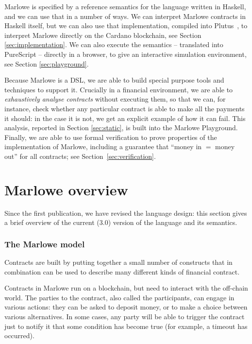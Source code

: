 \documentclass[runningheads]{llncs}
\begin{document}
Marlowe is specified by a reference semantics for the language written in Haskell, and we can use that in a number of ways. We can interpret Marlowe contracts in Haskell itself, but we can also use that implementation, compiled into Plutus~\cite{PlutusPlatform}, to interpret Marlowe directly on the Cardano blockchain, see Section \ref{sec:implementation}. We can also execute the semantics -- translated into PureScript -- directly in a browser, to give an interactive simulation environment, see Section \ref{sec:playground}.

Because Marlowe is a DSL, we are able to build special purpose tools and techniques to support it. Crucially in a financial environment, we are able to \emph{exhaustively analyse contracts} without executing them, so that we can, for instance, check whether any particular contract is able to make all the payments it should: in the case it is not, we get an explicit example of how it can fail. This analysis, reported in Section \ref{sec:static}, is built into the Marlowe Playground. Finally, we are able to use formal verification to prove properties of the implementation of Marlowe, including a guarantee that ``money in $=$ money out'' for all contracts; see Section~\ref{sec:verification}.

\section{Marlowe overview}
\label{sec:overview}

Since the first publication, we have revised the language design: this section gives a brief overview of the current (3.0) version of the language and its semantics.


\subsubsection*{The Marlowe model}

Contracts are built by putting together a small number of constructs that in combination can be used to describe many different kinds of financial contract.

Contracts in Marlowe run on a blockchain, but need to interact with the off-chain world. The parties to the contract, also called the participants, can engage in various actions: they can be asked to deposit money, or to make a choice between various alternatives. In some cases, any party will be able to trigger the contract just to notify it that some condition has become true (for example, a timeout has occurred).
\end{document}
